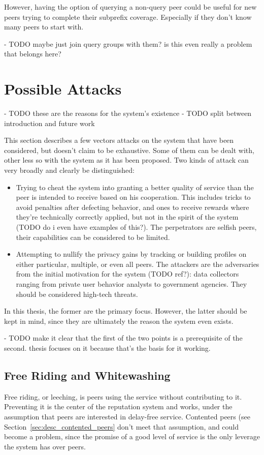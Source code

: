 However, having the option of querying a non-query peer could be useful for new
peers trying to complete their subprefix coverage. Especially if they don't know
many peers to start with.

- TODO maybe just join query groups with them? is this even really a problem
  that belongs here?

\section{Possible Attacks}
- TODO these are the reasons for the system's existence
- TODO split between introduction and future work

This section describes a few vectors attacks on the system that have been
considered, but doesn't claim to be exhaustive. Some of them can be dealt with,
other less so with the system as it has been proposed. Two kinds of attack can
very broadly and clearly be distinguished:
\begin{itemize}
\item Trying to cheat the system into granting a better quality of service than
the peer is intended to receive based on his cooperation. This includes tricks
to avoid penalties after defecting behavior, and ones to receive rewards where
they're technically correctly applied, but not in the spirit of the system (TODO
do i even have examples of this?). The perpetrators are selfish peers, their
capabilities can be considered to be limited.
\item Attempting to nullify the privacy gains by tracking or building profiles
on either particular, multiple, or even all peers. The attackers are the
adversaries from the initial motivation for the system (TODO ref?): data
collectors ranging from private user behavior analysts to government agencies.
They should be considered high-tech threats.
\end{itemize}

In this thesis, the former are the primary focus. However, the latter should be
kept in mind, since they are ultimately the reason the system even exists.

- TODO make it clear that the first of the two points is a prerequisite of the
  second. thesis focuses on it because that's the basis for it working.

\subsection{Free Riding and Whitewashing}
Free riding, or leeching, is peers using the service without contributing to it.
Preventing it is the center of the reputation system and works, under the
assumption that peers are interested in delay-free service. Contented peers (see
Section~\ref{sec:desc_contented_peers} don't meet that assumption, and could
become a problem, since the promise of a good level of service is the only
leverage the system has over peers.


